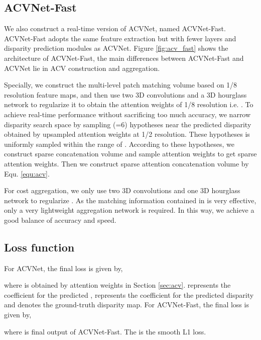 \documentclass[10pt,twocolumn,letterpaper]{article}
\begin{document}
\subsection{ACVNet-Fast} \label{sec:acv_fast}
We also construct a real-time version of ACVNet, named ACVNet-Fast. 
ACVNet-Fast adopts the same feature extraction but with fewer layers and disparity prediction modules as ACVNet. Figure \ref{fig:acv_fast} shows the architecture of ACVNet-Fast, the main differences between ACVNet-Fast and ACVNet lie in ACV construction and aggregation. 

Specially, we construct the multi-level patch matching volume based on 1/8 resolution feature maps, and then use two 3D convolutions and a 3D hourglass network to regularize it to obtain the attention weights of 1/8 resolution i.e. . To achieve real-time performance without sacrificing too much accuracy, we narrow disparity search space by sampling (=6) hypotheses near the predicted disparity  obtained by upsampled attention weights at 1/2 resolution. These hypotheses  is uniformly sampled within the range of . According to these hypotheses, we construct sparse concatenation volume and sample attention weights to get sparse attention weights. Then we construct sparse attention 
concatenation volume  by Equ. \ref{equ:acv}.

For cost aggregation, we only use two 3D convolutions and one 3D hourglass network to regularize . As the matching information contained in  is very effective, only a very lightweight aggregation network is required.
In this way, we achieve a good balance of accuracy and speed.

\subsection{Loss function} \label{sec:loss}
For ACVNet, the final loss is given by,

where  is obtained by attention weights  in Section \ref{sec:acv}.  represents the coefficient for the predicted ,   represents the coefficient for the  predicted disparity and  denotes the ground-truth disparity map. 
For ACVNet-Fast, the final loss is given by,

where  is final output of ACVNet-Fast. The  is the smooth L1 loss.
\end{document}
